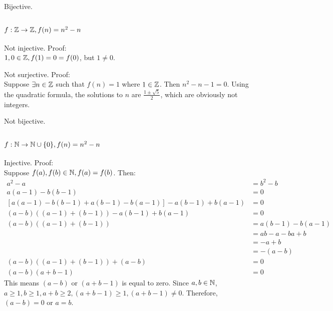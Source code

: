         Bijective. 

    \subsection{$f: \mathbb{Z} \to \mathbb{Z} , f(n) = n^2 - n$}
        Not injective. Proof: \\ 
            $1,0 \in \mathbb{Z}, f(1)= 0 = f(0)$, but $1 \neq 0$.

        Not surjective. Proof: \\ 
            Suppose $\exists n \in \mathbb{Z}$ such that $f(n) = 1$ where $1 \in\mathbb{Z}$.
            Then $n^2 - n - 1 = 0$. 
            Using the quadratic formula, 
            the solutions to $n$ are $\frac{1 \pm \sqrt{5}}{2}$,
            which are obviously not integers.

        Not bijective.

    \subsection{$f: \mathbb{N} \to \mathbb{N} \cup \{ 0 \}, f(n) = n^2 - n$}
        Injective. Proof: \\ 
            Suppose $f(a), f(b) \in \mathbb{N}, f(a) = f(b)$.
            Then:
            \begin{align*}
                a^2 - a &= b^2 - b \\ 
                a(a - 1) - b(b - 1) &= 0 \\ 
                [a(a - 1) - b(b-1) + a(b-1) - b(a - 1) ]
                    - a(b - 1)
                    + b(a - 1)
                    &= 0 \\
                (a - b)((a - 1) + (b - 1))
                    - a(b - 1)
                    + b(a - 1)
                    &= 0 \\ 
                (a - b)((a - 1) + (b - 1)) &= a(b - 1) - b(a - 1) \\ 
                &= ab - a - ba + b \\ 
                &= - a + b \\ 
                &= -(a - b) \\ 
                (a - b)((a - 1) + (b - 1)) + (a - b) &= 0 \\ 
                (a - b)(a + b - 1) &= 0  
            \end{align*}
            This means $(a - b)$ or $(a + b - 1)$ is equal to zero.
            Since $a, b\in\mathbb{N}$, $a \geq 1, b \geq 1, a + b \geq 2, (a + b - 1) \geq 1, (a + b - 1) \neq 0$. 
            Therefore, $(a - b) = 0$ or $a = b$. 

